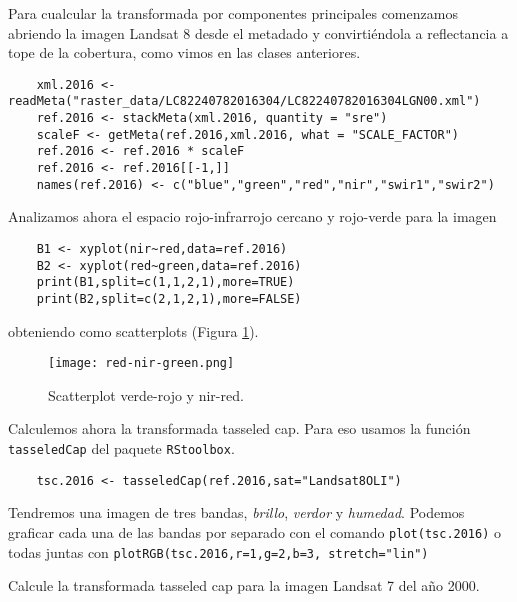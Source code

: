 \begin{exa}
    Para cualcular la transformada por componentes principales comenzamos
    abriendo la imagen Landsat 8 desde el metadado y convirti\'endola a reflectancia
    a tope de la cobertura, como vimos en las clases anteriores.
    \begin{lstlisting}
    xml.2016 <- readMeta("raster_data/LC82240782016304/LC82240782016304LGN00.xml")
    ref.2016 <- stackMeta(xml.2016, quantity = "sre")
    scaleF <- getMeta(ref.2016,xml.2016, what = "SCALE_FACTOR")
    ref.2016 <- ref.2016 * scaleF
    ref.2016 <- ref.2016[[-1,]]
    names(ref.2016) <- c("blue","green","red","nir","swir1","swir2")
    \end{lstlisting}

    Analizamos ahora el espacio rojo-infrarrojo cercano y rojo-verde para la imagen

    \begin{lstlisting}
    B1 <- xyplot(nir~red,data=ref.2016)
    B2 <- xyplot(red~green,data=ref.2016)
    print(B1,split=c(1,1,2,1),more=TRUE)
    print(B2,split=c(2,1,2,1),more=FALSE)
    \end{lstlisting}

    obteniendo como scatterplots (Figura \ref{fig:green-red}).

    \begin{figure}[h!]
    \begin{center}
        \texttt{[image: red-nir-green.png]}
    \end{center}
    \caption{Scatterplot verde-rojo y nir-red.}
    \label{fig:green-red}
    \end{figure}

    Calculemos ahora la transformada tasseled cap. Para eso usamos la funci\'on
    \texttt{tasseledCap} del paquete \texttt{RStoolbox}.
    \begin{lstlisting}
    tsc.2016 <- tasseledCap(ref.2016,sat="Landsat8OLI")
    \end{lstlisting}
    Tendremos una imagen de tres bandas, \emph{brillo}, \emph{verdor} y
    \emph{humedad}. Podemos graficar cada una de las bandas por separado con el
    comando \texttt{plot(tsc.2016)} o todas juntas con \texttt{plotRGB(tsc.2016,r=1,g=2,b=3, stretch="lin")}
\end{exa}

\begin{act}
    Calcule la transformada tasseled cap para la imagen Landsat 7 del año 2000.
\end{act}

